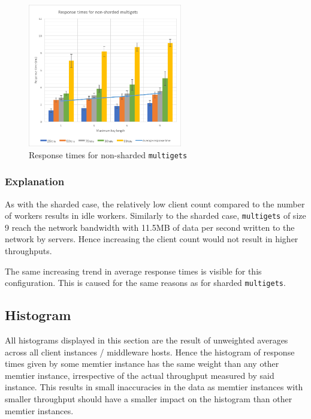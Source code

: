 \documentclass[11pt,a4paper]{article}
\begin{document}
\begin{figure}[!h]
    \centering
    \includegraphics[width=0.6\textwidth]{processing/graphics/get_and_multigets_latency-keylen_non-sharded.png}
    \caption{Response times for non-sharded \texttt{multigets}}
    \label{png::get_and_multigets_latency-keylen_non-sharded}
\end{figure}

\subsubsection{Explanation}
As with the sharded case, the relatively low client count compared to the number of workers results in idle workers. Similarly to the sharded case, \texttt{multigets} of size 9 reach the network bandwidth with 11.5MB of data per second written to the network by servers. Hence increasing the client count would not result in higher throughputs.

The same increasing trend in average response times is visible for this configuration. This is caused for the same reasons as for sharded \texttt{multigets}.

\subsection{Histogram}
All histograms displayed in this section are the result of unweighted averages across all client instances / middleware hosts. Hence the histogram of response times given by some memtier instance has the same weight than any other memtier instance, irrespective of the actual throughput measured by said instance. This results in small inaccuracies in the data as memtier instances with smaller throughput should have a smaller impact on the histogram than other memtier instances.
\end{document}
